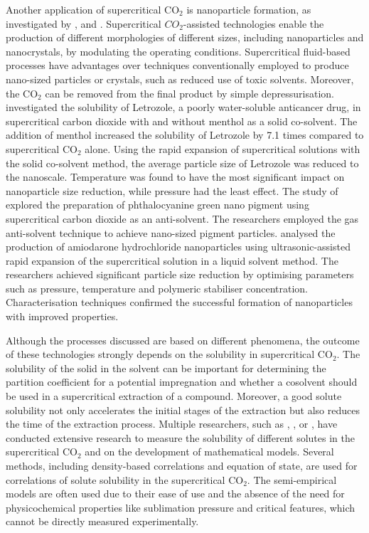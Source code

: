 \documentclass[a4paper,fleqn]{cas-dc}
\begin{document}
Another application of supercritical CO$_2$ is nanoparticle formation, as investigated by \citet{Padrela2018}, \citet{Franco2021} and \citet{Sodeifian2022}. Supercritical $CO_2$-assisted technologies enable the production of different morphologies of different sizes, including nanoparticles and nanocrystals, by modulating the operating conditions. Supercritical fluid-based processes have advantages over techniques conventionally employed to produce nano-sized particles or crystals, such as reduced use of toxic solvents. Moreover, the CO$_2$ can be removed from the final product by simple depressurisation. 
\citet{Sodeifian2018} investigated the solubility of Letrozole, a poorly water-soluble anticancer drug, in supercritical carbon dioxide with and without menthol as a solid co-solvent. The addition of menthol increased the solubility of Letrozole by 7.1 times compared to supercritical CO$_2$ alone. Using the rapid expansion of supercritical solutions with the solid co-solvent method, the average particle size of Letrozole was reduced to the nanoscale. Temperature was found to have the most significant impact on nanoparticle size reduction, while pressure had the least effect. 
The study of \citet{SaadatiArdestani2020} explored the preparation of phthalocyanine green nano pigment using supercritical carbon dioxide as an anti-solvent. The researchers employed the gas anti-solvent technique to achieve nano-sized pigment particles.
\citet{Sodeifian2019} analysed the production of amiodarone hydrochloride nanoparticles using ultrasonic-assisted rapid expansion of the supercritical solution in a liquid solvent method. The researchers achieved significant particle size reduction by optimising parameters such as pressure, temperature and polymeric stabiliser concentration. Characterisation techniques confirmed the successful formation of nanoparticles with improved properties.

Although the processes discussed are based on different phenomena, the outcome of these technologies strongly depends on the solubility in supercritical CO$_2$. The solubility of the solid in the solvent can be important for determining the partition coefficient for a potential impregnation and whether a cosolvent should be used in a supercritical extraction of a compound. Moreover, a good solute solubility not only accelerates the initial stages of the extraction but also reduces the time of the extraction process. Multiple researchers, such as \citet{Bagheri2025}, \citet{Tabebordbar2024}, \citet{SheikhiKouhsar2024} or \citet{Bagheri2022}, have conducted extensive research to measure the solubility of different solutes in the supercritical CO$_2$ and on the development of mathematical models. Several methods, including density-based correlations and equation of state, are used for correlations of solute solubility in the supercritical CO$_2$. The semi-empirical models are often used due to their ease of use and the absence of the need for physicochemical properties like sublimation pressure and critical features, which cannot be directly measured experimentally.
\end{document}
